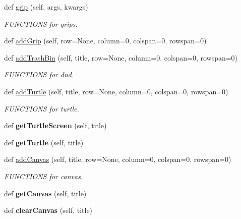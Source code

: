 \begin{DoxyCompactItemize}
def \hyperlink{classappjar_1_1gui_a2f302320716e6b119316961e1c51f354}{grip} (self, args, kwargs)
\begin{DoxyCompactList}\small\item\em F\+U\+N\+C\+T\+I\+O\+NS for grips. \end{DoxyCompactList}\item 
def \hyperlink{classappjar_1_1gui_a6056aeaae732dea363335e4603cdf530}{add\+Grip} (self, row=None, column=0, colspan=0, rowspan=0)
\item 
def \hyperlink{classappjar_1_1gui_ac7bb3be2f249fc846bfd207b94a55d58}{add\+Trash\+Bin} (self, title, row=None, column=0, colspan=0, rowspan=0)
\begin{DoxyCompactList}\small\item\em F\+U\+N\+C\+T\+I\+O\+NS for dnd. \end{DoxyCompactList}\item 
def \hyperlink{classappjar_1_1gui_a9ec18e34756f48bef27de30a349cb078}{add\+Turtle} (self, title, row=None, column=0, colspan=0, rowspan=0)
\begin{DoxyCompactList}\small\item\em F\+U\+N\+C\+T\+I\+O\+NS for turtle. \end{DoxyCompactList}\item 
\mbox{\label{classappjar_1_1gui_a404a5681a3382d4f884b850ee7be01ad}} 
def {\bfseries get\+Turtle\+Screen} (self, title)
\item 
\mbox{\label{classappjar_1_1gui_a928374bce8d76f3962d6efaf991aa8e0}} 
def {\bfseries get\+Turtle} (self, title)
\item 
def \hyperlink{classappjar_1_1gui_a9a246e214fb1afe00e39db46b935fd9e}{add\+Canvas} (self, title, row=None, column=0, colspan=0, rowspan=0)
\begin{DoxyCompactList}\small\item\em F\+U\+N\+C\+T\+I\+O\+NS for canvas. \end{DoxyCompactList}\item 
\mbox{\label{classappjar_1_1gui_a173bd66ef849ee0ab59788d46a81a866}} 
def {\bfseries get\+Canvas} (self, title)
\item 
\mbox{\label{classappjar_1_1gui_add814c4dbeee71f5d87f9b6a1d8849c2}} 
def {\bfseries clear\+Canvas} (self, title)
\item 

\end{DoxyCompactItemize}
